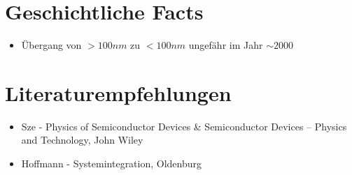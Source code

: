 \section{Geschichtliche Facts}
\begin{itemize}
	\item Übergang von $>100nm$ zu $<100nm$ ungefähr im Jahr $\sim 2000$
\end{itemize}

\section{Literaturempfehlungen}
\begin{itemize}
	\item Sze - Physics of Semiconductor Devices \& Semiconductor Devices – Physics and Technology, John Wiley \\
	\item Hoffmann - Systemintegration, Oldenburg
\end{itemize}